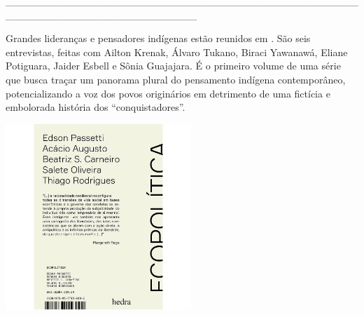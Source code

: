 \hspace*{-2cm}\_\_\_\_\_\_\_\_\_\_\_\_\_\_\_\_\_\_\_\_\_\_\_\_\_\_\_\_\_\_\_\_\_\_\_\_\_\_\_\_\_\_\_\_\_\_\_\_\_\_\_\_\_\_\_\_\_\_\_\_\_\_\_\_\_\_\_\_\_\_\_\_\_\_

\medskip

\noindent{}Grandes lideranças e pensadores indígenas estão reunidos em {}. São seis entrevistas, feitas com Ailton Krenak, Álvaro Tukano, Biraci Yawanawá, Eliane Potiguara, Jaider Esbell e Sônia Guajajara. É o primeiro volume de uma série que busca traçar um panorama plural do pensamento indígena contemporâneo, potencializando a voz dos povos originários em detrimento de uma fictícia e embolorada história dos “conquistadores”.

\hspace{.5cm}

\hspace*{-.4cm}\begin{minipage}[c]{0.90\linewidth}
\small{
{}}
\end{minipage}


\pagebreak

\hspace{.5cm}

\begin{center}
\hspace*{-1cm}
\hspace*{1cm}\includegraphics[width=70mm]{eco.jpeg}
\end{center}

